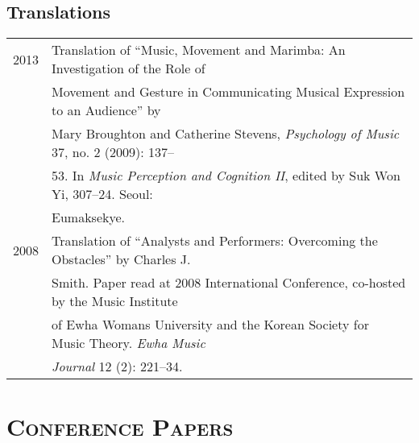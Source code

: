 \documentclass[a4paper,11pt]{article}
\begin{document}
  \subsection*{Translations}
  \hspace*{-0.25cm}
  \begin{tabular}{p{2.5cm} p{12.5cm}}
    2013 & Translation of “Music, Movement and Marimba: An Investigation of the Role of\\
    & Movement and Gesture in Communicating Musical Expression to an Audience” by\\
    & Mary Broughton and Catherine Stevens, \textit{Psychology of Music} 37, no. 2 (2009): 137–\\
    & 53. In \textit{Music Perception and Cognition II}, edited by Suk Won Yi, 307–24. Seoul:\\
    & Eumaksekye.\\[2mm]
    
    2008 & Translation of “Analysts and Performers: Overcoming the Obstacles” by Charles J.\\
    & Smith. Paper read at 2008 International Conference, co-hosted by the Music Institute\\
    & of Ewha Womans University and the Korean Society for Music Theory. \textit{Ewha Music}\\
    & \textit{Journal} 12 (2): 221–34.
  \end{tabular}
  
  
  \vspace{5.0mm}
  
  \section*{\textsc{Conference Papers}}
  
\end{document}
